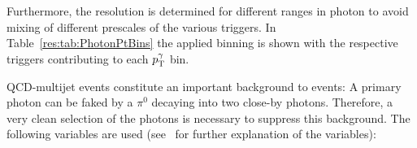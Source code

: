 Furthermore, the resolution is determined for different ranges in photon \pt to avoid mixing of different prescales of the various triggers. 
In Table~\ref{res:tab:PhotonPtBins} the applied binning is shown with the respective triggers contributing to each $p_{\text{T}}^{\gamma}$ bin.
\renewcommand{\arraystretch}{1.5}
\begin{table}[htb]
\centering
\caption{Photon \pt bins and corresponding triggers.}
\label{res:tab:PhotonPtBins}
\end{table}

QCD-multijet events constitute an important background to \GAMJET events: A primary photon can be faked by a $\pi^{0}$ decaying into two close-by photons. 
Therefore, a very clean selection of the photons is necessary to suppress this background.
The following variables are used (see~\cite{CMS-PAS-EGM-10-006} for further explanation of the variables):

